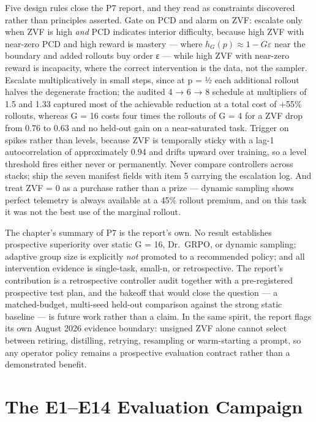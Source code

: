 \documentclass[12pt,a4paper]{report}
\begin{document}
Five design rules close the P7 report, and they read as constraints
discovered rather than principles asserted. Gate on PCD and alarm on
ZVF: escalate only when ZVF is high \emph{and} PCD indicates interior
difficulty, because high ZVF with near-zero PCD and high reward is
mastery --- where \(h_G(p) \approx 1 - G\varepsilon\) near the boundary
and added rollouts buy order ε --- while high ZVF with near-zero reward
is incapacity, where the correct intervention is the data, not the
sampler. Escalate multiplicatively in small steps, since at p = ½ each
additional rollout halves the degenerate fraction; the audited 4 → 6 → 8
schedule at multipliers of 1.5 and 1.33 captured most of the achievable
reduction at a total cost of +55\% rollouts, whereas G = 16 costs four
times the rollouts of G = 4 for a ZVF drop from 0.76 to 0.63 and no
held-out gain on a near-saturated task. Trigger on spikes rather than
levels, because ZVF is temporally sticky with a lag-1 autocorrelation of
approximately 0.94 and drifts upward over training, so a level threshold
fires either never or permanently. Never compare controllers across
stacks; ship the seven manifest fields with item 5 carrying the
escalation log. And treat ZVF = 0 as a purchase rather than a prize ---
dynamic sampling shows perfect telemetry is always available at a 45\%
rollout premium, and on this task it was not the best use of the
marginal rollout.

The chapter's summary of P7 is the report's own. No result establishes
prospective superiority over static G = 16, Dr.~GRPO, or dynamic
sampling; adaptive group size is explicitly \emph{not} promoted to a
recommended policy; and all intervention evidence is single-task,
small-n, or retrospective. The report's contribution is a retrospective
controller audit together with a pre-registered prospective test plan,
and the bakeoff that would close the question --- a matched-budget,
multi-seed held-out comparison against the strong static baseline --- is
future work rather than a claim. In the same spirit, the report flags
its own August 2026 evidence boundary: unsigned ZVF alone cannot select
between retiring, distilling, retrying, resampling or warm-starting a
prompt, so any operator policy remains a prospective evaluation contract
rather than a demonstrated benefit.



\chapter{The E1--E14 Evaluation
Campaign}\label{the-e1e14-evaluation-campaign}
\end{document}
